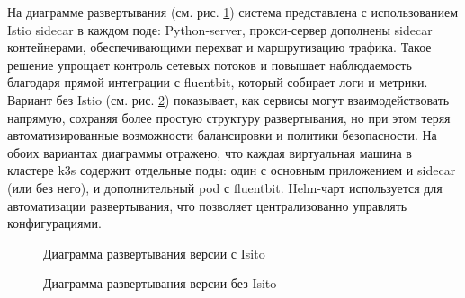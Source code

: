 На диаграмме развертывания (см. рис. \ref{pic:deployment-diagram-Istio}) система представлена с использованием Istio sidecar в каждом поде: Python-server, прокси‐сервер дополнены sidecar контейнерами, обеспечивающими перехват и маршрутизацию трафика. Такое решение упрощает контроль сетевых потоков и повышает наблюдаемость благодаря прямой интеграции с fluentbit, который собирает логи и метрики. Вариант без Istio (см. рис. \ref{pic:deployment-diagram-NOIstio}) показывает, как сервисы могут взаимодействовать напрямую, сохраняя более простую структуру развертывания, но при этом теряя автоматизированные возможности балансировки и политики безопасности. На обоих вариантах диаграммы отражено, что каждая виртуальная машина в кластере k3s содержит отдельные поды: один с основным приложением и sidecar (или без него), и дополнительный pod с fluentbit. Helm-чарт используется для автоматизации развертывания, что позволяет централизованно управлять конфигурациями. 

\begin{figure}[t]
    \centering
    \caption{Диаграмма развертывания версии с Isito}
    \label{pic:deployment-diagram-Istio}
  \end{figure}
  

  \begin{figure}[t]
      \centering
      \caption{Диаграмма развертывания версии без Isito}
      \label{pic:deployment-diagram-NOIstio}
    \end{figure}



